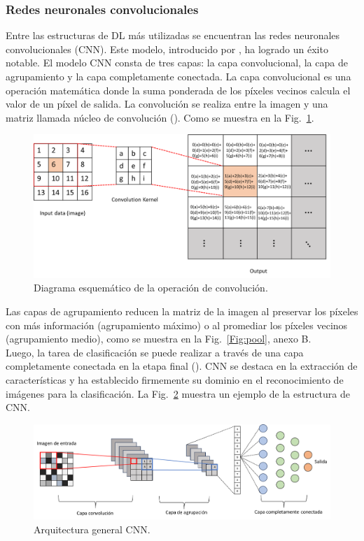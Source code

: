 \documentclass[11pt,a4paper,openany]{article}
\begin{document}
        \subsubsection{Redes neuronales convolucionales}
        Entre las estructuras de DL más utilizadas se encuentran las redes neuronales convolucionales (CNN). Este modelo, introducido por \cite{Lecun1989}, ha logrado un éxito notable. El modelo CNN consta de tres capas: la capa convolucional, la capa de agrupamiento y la capa completamente conectada. La capa convolucional es una operación matemática donde la suma ponderada de los píxeles vecinos calcula el valor de un píxel de salida. La convolución se realiza entre la imagen y una matriz llamada núcleo de convolución (\cite{Esqueda2005}). Como se muestra en la Fig.~\ref{Fig:Conv}. \\

        \begin{figure}[H]
            \centering
            \includegraphics[scale=0.4]{CV.png} 
            \caption{Diagrama esquemático de la operación de convolución. \label{Fig:Conv}}
        \end{figure}

        Las capas de agrupamiento reducen la matriz de la imagen al preservar los píxeles con más información (agrupamiento máximo) o al promediar los píxeles vecinos (agrupamiento medio), como se muestra en la Fig.~\ref{Fig:pool}, anexo B. \\

        Luego, la tarea de clasificación se puede realizar a través de una capa completamente conectada en la etapa final (\cite{Manakitsa2024}). CNN se destaca en la extracción de características y ha establecido firmemente su dominio en el reconocimiento de imágenes para la clasificación. La Fig.~\ref{fig:CNN-A} muestra un ejemplo de la estructura de CNN.
    
        \begin{figure}[h]
            \centering
            \includegraphics[width=13cm]{CNN.png}
            \caption {Arquitectura general CNN. \label{fig:CNN-A}}
        \end{figure}
\end{document}
